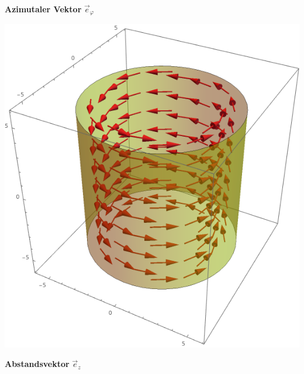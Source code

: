 \begin{minipage}[t]{0.48\linewidth}



	\begin{center}

		\textbf{Azimutaler Vektor} $\vec{e}_\varphi$

	\end{center}

	\begin{center}

			\includegraphics[scale=0.3]{zylindric_phi.png}


	\end{center}

\end{minipage}


\begin{center}

	\textbf{Abstandsvektor} $\vec{e}_z$

\end{center}

